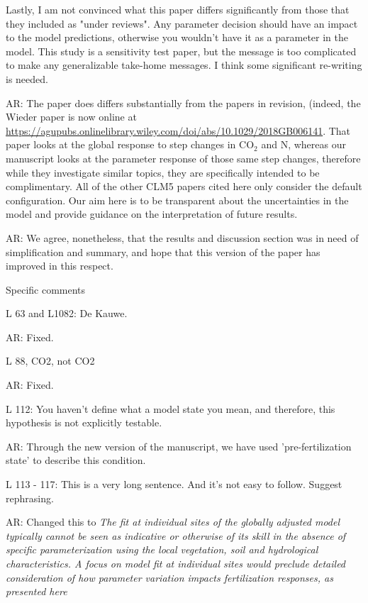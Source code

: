 \documentclass{article}
\begin{document}
Lastly, I am not convinced what this paper differs significantly from those that they included as "under reviews". Any parameter decision should have an impact to the model predictions, otherwise you wouldn't have it as a parameter in the model. This study is a sensitivity test paper, but the message is too complicated to make any generalizable take-home messages. I think some significant re-writing is needed. 

\textsf{AR: The paper does  differs substantially from the papers in revision, (indeed, the Wieder paper is now online at \url{https://agupubs.onlinelibrary.wiley.com/doi/abs/10.1029/2018GB006141}. That paper looks at the global response to step changes in CO$_{2}$ and N, whereas our manuscript looks at the parameter response of those same step changes, therefore while they investigate similar topics, they are specifically intended to be complimentary.  All of the other CLM5 papers cited here only consider the default configuration. Our aim here is to be transparent about the uncertainties in the model and provide guidance on the interpretation of future results. } 

\textsf{AR: We agree, nonetheless, that the results and discussion section was in need of simplification and summary, and hope that this version of the paper has improved in this respect.}

Specific comments 

L 63 and L1082: De Kauwe. 

\textsf{AR: Fixed.}

L 88, CO2, not CO2 

\textsf{AR: Fixed.}

L 112: You haven't define what a model state you mean, and therefore, this hypothesis is not explicitly testable. 

\textsf{AR: Through the new version of the manuscript, we have used 'pre-fertilization state' to describe this condition. }

L 113 - 117: This is a very long sentence. And it's not easy to follow. Suggest rephrasing.

\textsf{AR: Changed this to \emph{ The fit at individual sites of the globally adjusted model typically cannot be seen as indicative or otherwise of its skill in the absence of specific parameterization using the local vegetation, soil and hydrological characteristics. A focus on model fit at individual sites would preclude detailed consideration of how parameter variation impacts fertilization responses, as presented here}}
\end{document}
